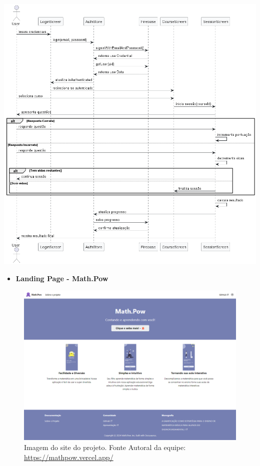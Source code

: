 \documentclass[12pt, openany, oneside, a4paper, english, brazil]{abntex2}   %
\begin{document}
\begin{center}
\includegraphics[width=\linewidth]{figuras/DiagramsUMLs/Math Pow Sequence.png}
\label{fig:diagrama-de-sequencia}
\end{center}

\begin{itemize}
    \item \textbf{Landing Page - Math.Pow}
\end{itemize}

\begin{figure}[h!]
    \centering
    \includegraphics[width=0.8\linewidth]{figuras/Math.Pow App/mathPow.png}
    \caption{Imagem do site do projeto. Fonte Autoral da equipe: \url{https://mathpow.vercel.app/}}
    \label{fig:Figma}
\end{figure}
\end{document}
